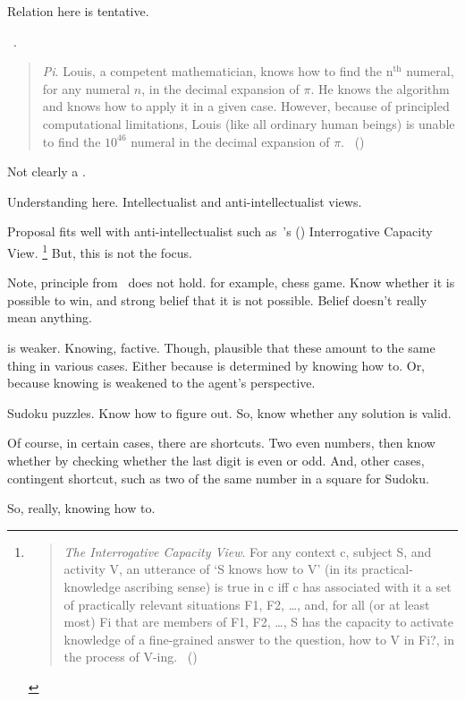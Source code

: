 \begin{note}
  Relation here is tentative.

  ~\cite{Bengson:2011th}.
  \begin{quote}
    \emph{Pi}.
    Louis, a competent mathematician, knows how to find the n\(^{\text{th}}\) numeral, for any numeral \(n\), in the decimal expansion of \(\pi\).
    He knows the algorithm and knows how to apply it in a given case.
    However, because of principled computational limitations, Louis (like all ordinary human beings) is unable to find the \(10^{46}\) numeral in the decimal expansion of \(\pi\).%
    \mbox{ }\hfill\mbox{(\citeyear[170]{Bengson:2011th})}
  \end{quote}

  Not clearly a \fc{}.
\end{note}

\begin{note}
  Understanding here.
  Intellectualist and anti-intellectualist views.

  Proposal fits well with anti-intellectualist such as~\citeauthor{Habgood-Coote:2019we}'s (\citeyear{Habgood-Coote:2019we}) Interrogative Capacity View.%
  \footnote{
    \begin{quote}
      \emph{The Interrogative Capacity View}.
      For any context c, subject S, and activity V, an utterance of `S knows how to V' (in its practical-knowledge ascribing sense) is true in c iff c has associated with it a set of practically relevant situations {F1, F2, \dots}, and, for all (or at least most) Fi that are members of {F1, F2, \dots}, S has the capacity to activate knowledge of a ﬁne-grained answer to the question, how to V in Fi?, in the process of V-ing.%
      \mbox{ }\hfill\mbox{(\citeyear[92]{Habgood-Coote:2019we})}
    \end{quote}
  }
  But, this is not the focus.
\end{note}

\begin{note}
  Note, principle from~\cite{Barker:1975un} does not hold.
  for example, chess game.
  Know whether it is possible to win, and strong belief that it is not possible.
  Belief doesn't really mean anything.
\end{note}

\begin{note}
   is weaker.
  Knowing, factive.
  Though, plausible that these amount to the same thing in various cases.
  Either because \fc{} is determined by knowing how to.
  Or, because knowing is weakened to the agent's perspective.

  Sudoku puzzles.
  Know how to figure out.
  So, know whether any solution is valid.

  Of course, in certain cases, there are shortcuts.
  Two even numbers, then know whether by checking whether the last digit is even or odd.
  And, other cases, contingent shortcut, such as two of the same number in a square for Sudoku.

  So, really, knowing how to.
\end{note}

